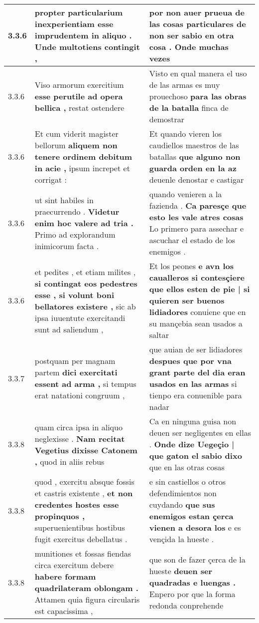 \begin{tabular}{|p{1cm}|p{6.5cm}|p{6.5cm}|}
3.3.6 & propter particularium inexperientiam \textbf{ esse imprudentem in aliquo . } Unde multotiens contingit , & por non auer prueua de las cosas particulares \textbf{ de non ser sabio en otra cosa . } Onde muchas vezes \\\hline
3.3.6 & Viso armorum exercitium \textbf{ esse perutile ad opera bellica , } restat ostendere & Visto en qual manera el uso de las armas es muy prouechoso \textbf{ para las obras de la batalla } finca de demostrar \\\hline
3.3.6 & Et cum viderit magister bellorum \textbf{ aliquem non tenere ordinem debitum in acie , } ipsum increpet et corrigat : & Et quando vieren los caudiellos maestros de las batallas \textbf{ que alguno non guarda orden en la az } deuenle denostar e castigar \\\hline
3.3.6 & ut sint habiles in praecurrendo . \textbf{ Videtur enim hoc valere ad tria . } Primo ad explorandum inimicorum facta . & quando venieren a la fazienda . \textbf{ Ca paresçe que esto les vale atres cosas } Lo primero para assechar e ascuchar el estado de los enemigos . \\\hline
3.3.6 & et pedites , et etiam milites , \textbf{ si contingat eos pedestres esse , si volunt boni bellatores existere , } sic ab ipsa iuuentute exercitandi sunt ad saliendum , & Et los peones \textbf{ e avn los caualleros si contesçiere que ellos esten de pie | si quieren ser buenos lidiadores } conuiene que en su mançebia sean usados a saltar \\\hline
3.3.7 & postquam per magnam partem \textbf{ dici exercitati essent ad arma , } si tempus erat natationi congruum , & que auian de ser lidiadores \textbf{ despues que por vna grant parte del dia eran usados en las armas } si tienpo era conuenible para nadar \\\hline
3.3.8 & quam circa ipsa in aliquo neglexisse . \textbf{ Nam recitat Vegetius dixisse Catonem , } quod in aliis rebus & Ca en ninguna guisa non deuen ser negligentes en ellas . \textbf{ Onde dize Uegeçio | que gaton el sabio dixo } que en las otras cosas \\\hline
3.3.8 & quod , exercitu absque fossis et castris existente , \textbf{ et non credentes hostes esse propinquos , } superuenientibus hostibus fugit exercitus debellatus . & e sin castiellos o otros defendimientos non cuydando \textbf{ que sus enemigos estan çerca vienen a desora los } e es vençida la hueste . \\\hline
3.3.8 & munitiones et fossas fiendas circa exercitum debere \textbf{ habere formam quadrilateram oblongam . } Attamen quia figura circularis est capacissima , & que son de fazer çerca de la hueste \textbf{ deuen ser quadradas e luengas . } Enpero por que la forma redonda conprehende \\\hline

\end{tabular}
